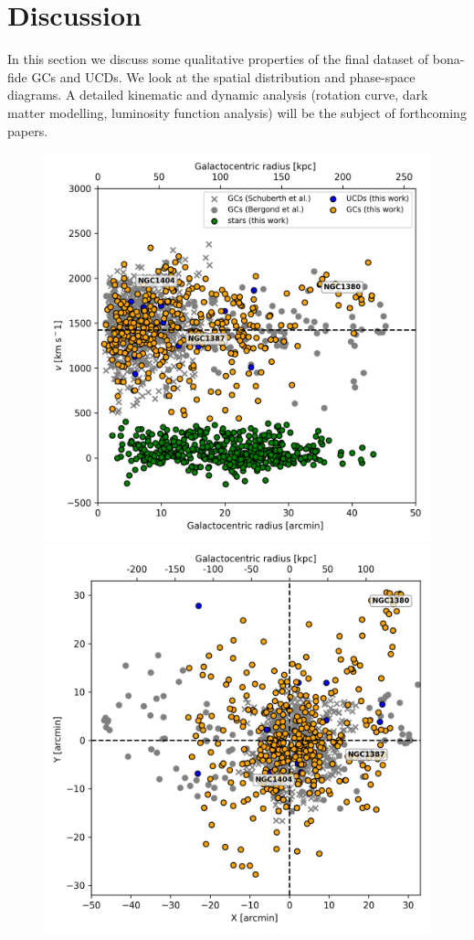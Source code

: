 \documentclass[useAMS,usenatbib]{mn2e}
\begin{document}
\section{Discussion}
\label{sec:discussion}
In this section we discuss some qualitative properties of the final dataset of bona-fide GCs and UCDs. We 
look at the spatial distribution and phase-space diagrams. A detailed kinematic 
and dynamic analysis (rotation curve, dark matter modelling, luminosity 
function analysis) will be the subject of forthcoming papers.

\begin{figure}
\centering
\includegraphics[width=\columnwidth]{figures/RV.png} 
\includegraphics[width=\columnwidth]{figures/XY.png} 

\end{figure}
\end{document}
